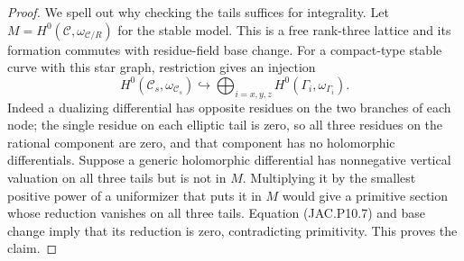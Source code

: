 \begin{proof}
We spell out why checking the tails suffices for integrality.
Let $M=H^0(\mathcal C,\omega_{\mathcal C/R})$ for the stable model.
This is a free rank-three lattice and its formation commutes with
residue-field base change. For a compact-type stable curve with
this star graph, restriction gives an injection
\[
 H^0(\mathcal C_s,\omega_{\mathcal C_s})
       \hookrightarrow\bigoplus_{i=x,y,z}
                           H^0(\Gamma_i,\omega_{\Gamma_i}).
                                                        \tag{JAC.P10.7}
\]
Indeed a dualizing differential has opposite residues on the two
branches of each node; the single residue on each elliptic tail
is zero, so all three residues on the rational component are zero,
and that component has no holomorphic differentials.
Suppose a generic holomorphic differential has nonnegative vertical
valuation on all three tails but is not in $M$. Multiplying it by
the smallest positive power of a uniformizer that puts it in $M$
would give a primitive section whose reduction vanishes on all
three tails. Equation (JAC.P10.7) and base change imply that its
reduction is zero, contradicting primitivity. This proves the claim.


\end{proof}
